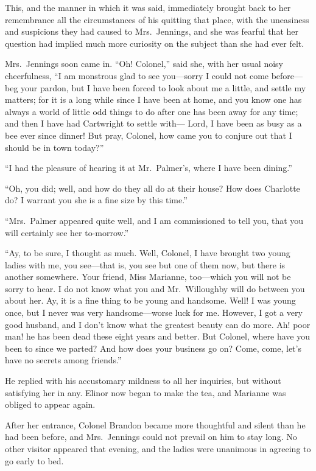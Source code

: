 \documentclass{article}
\begin{document}
This, and the manner in which it was said,
immediately brought back to her remembrance all the
circumstances of his quitting that place, with the
uneasiness and suspicions they had caused to Mrs.\ Jennings,
and she was fearful that her question had implied
much more curiosity on the subject than she had ever felt.

Mrs.\ Jennings soon came in.  ``Oh! Colonel,'' said she,
with her usual noisy cheerfulness, ``I am monstrous glad
to see you---sorry I could not come before---beg your
pardon, but I have been forced to look about me a little,
and settle my matters; for it is a long while since I
have been at home, and you know one has always a world
of little odd things to do after one has been away for
any time; and then I have had Cartwright to settle with---%
Lord, I have been as busy as a bee ever since dinner!
But pray, Colonel, how came you to conjure out that I should
be in town today?''

``I had the pleasure of hearing it at Mr.\ Palmer's,
where I have been dining.''

``Oh, you did; well, and how do they all do at their
house?  How does Charlotte do?  I warrant you she is a fine
size by this time.''

``Mrs.\ Palmer appeared quite well, and I am commissioned
to tell you, that you will certainly see her to-morrow.''

``Ay, to be sure, I thought as much.  Well, Colonel,
I have brought two young ladies with me, you see---that is,
you see but one of them now, but there is another somewhere.
Your friend, Miss Marianne, too---which you will not be
sorry to hear.  I do not know what you and Mr.\ Willoughby
will do between you about her.  Ay, it is a fine thing
to be young and handsome.  Well! I was young once, but I
never was very handsome---worse luck for me.  However, I got
a very good husband, and I don't know what the greatest
beauty can do more.  Ah! poor man! he has been dead
these eight years and better.  But Colonel, where have
you been to since we parted?  And how does your business
go on?  Come, come, let's have no secrets among friends.''

He replied with his accustomary mildness to all
her inquiries, but without satisfying her in any.
Elinor now began to make the tea, and Marianne was
obliged to appear again.

After her entrance, Colonel Brandon became
more thoughtful and silent than he had been before,
and Mrs.\ Jennings could not prevail on him to stay long.
No other visitor appeared that evening, and the ladies
were unanimous in agreeing to go early to bed.
\end{document}

